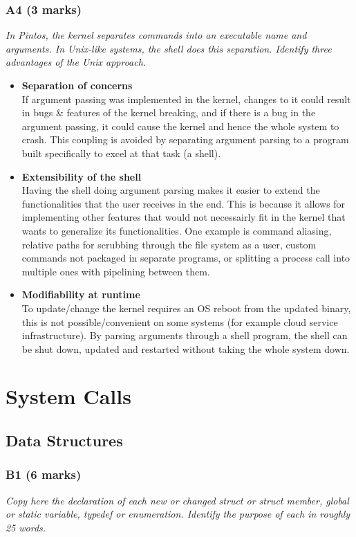 \documentclass{report}
\newcommand{\question}[1]{\textit{#1} \ }
\newcommand{\bullpara}[2]{\item \textbf{#1} \ #2}
\begin{document}
            \subsubsection*{A4 (3 marks)}
                \question{In Pintos, the kernel separates commands into an executable name and arguments. In Unix-like systems, the shell 
                does this separation. Identify three advantages of the Unix approach.}
                \begin{itemize}
                    \bullpara{Separation of concerns}{\\ If argument passing was implemented in the kernel, changes to it could result in bugs \& features of the kernel breaking, and if there is a bug in the argument passing, it could cause the kernel and hence the whole system to crash. This coupling is avoided by separating argument parsing to a program built specifically to excel at that task (a shell).}
                    \bullpara{Extensibility of the shell}{\\ Having the shell doing argument parsing makes it easier to extend the functionalities that the user receives in the end.
                    This is because it allows for implementing other features that would not necessairly fit in the kernel that wants to generalize its functionalities.
                    One example is command aliasing, relative paths for scrubbing through the file system as a user, custom commands not packaged in separate programs,
                    or splitting a process call into multiple ones with pipelining between them.}
                    \bullpara{Modifiability at runtime} {\\ To update/change the kernel requires an OS reboot from the updated binary, this is not possible/convenient on some systems (for example cloud service infrastructure).
                    By parsing arguments through a shell program, the shell can be shut down, updated and restarted without taking the whole system down.}
                \end{itemize}
            
    \section*{System Calls}
        \subsection*{Data Structures}
            \subsubsection*{B1 (6 marks)}
                \question{Copy here the declaration of each new or changed struct or struct member, global or static variable, typedef or
                 enumeration. Identify the purpose of each in roughly 25 words.}
\end{document}
